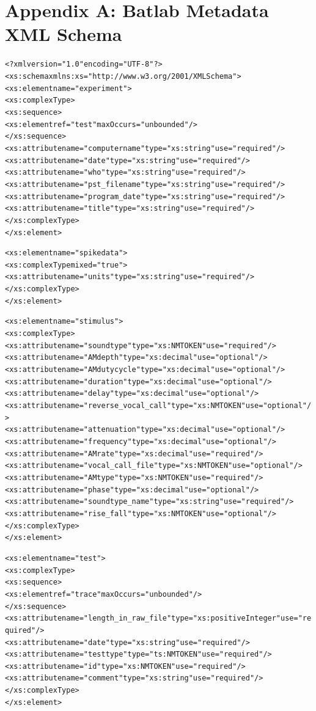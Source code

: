 \documentclass[11pt,letterpaper]{article}
\begin{document}
\section{Appendix A: Batlab Metadata XML Schema}
\begin{footnotesize}
\begin{alltt}
<?xml version="1.0" encoding="UTF-8" ?>\\
<xs:schema xmlns:xs="http://www.w3.org/2001/XMLSchema">
  <xs:element name="experiment">
    <xs:complexType>
      <xs:sequence>
        <xs:element ref="test" maxOccurs="unbounded" />
      </xs:sequence>
      <xs:attribute name="computername" type="xs:string" use="required" />
      <xs:attribute name="date" type="xs:string" use="required" />
      <xs:attribute name="who" type="xs:string" use="required" />
      <xs:attribute name="pst_filename" type="xs:string" use="required" />
      <xs:attribute name="program_date" type="xs:string" use="required" />
      <xs:attribute name="title" type="xs:string" use="required" />
    </xs:complexType>
  </xs:element>

  <xs:element name="spikedata">
    <xs:complexType mixed="true">
      <xs:attribute name="units" type="xs:string" use="required" />
    </xs:complexType>
  </xs:element>

  <xs:element name="stimulus">
    <xs:complexType>
      <xs:attribute name="soundtype" type="xs:NMTOKEN" use="required" />
      <xs:attribute name="AMdepth" type="xs:decimal" use="optional" />
      <xs:attribute name="AMdutycycle" type="xs:decimal" use="optional"/>
      <xs:attribute name="duration" type="xs:decimal" use="optional" />
      <xs:attribute name="delay" type="xs:decimal" use="optional" />
      <xs:attribute name="reverse_vocal_call" type="xs:NMTOKEN" use="optional" />
      <xs:attribute name="attenuation" type="xs:decimal" use="optional" />
      <xs:attribute name="frequency" type="xs:decimal" use="optional" />
      <xs:attribute name="AMrate" type="xs:decimal" use="required" />
      <xs:attribute name="vocal_call_file" type="xs:NMTOKEN" use="optional" />
      <xs:attribute name="AMtype" type="xs:NMTOKEN" use="required" />
      <xs:attribute name="phase" type="xs:decimal" use="optional" />
      <xs:attribute name="soundtype_name" type="xs:string" use="required" />
      <xs:attribute name="rise_fall" type="xs:NMTOKEN" use="optional" />
    </xs:complexType>
  </xs:element>

  <xs:element name="test">
    <xs:complexType>
      <xs:sequence>
        <xs:element ref="trace" maxOccurs="unbounded" />
      </xs:sequence>
      <xs:attribute name="length_in_raw_file" type="xs:positiveInteger" use="required" />
      <xs:attribute name="date" type="xs:string" use="required" />
      <xs:attribute name="testtype" type="ts:NMTOKEN" use="required" />
      <xs:attribute name="id" type="xs:NMTOKEN" use="required" />
      <xs:attribute name="comment" type="xs:string" use="required" />
    </xs:complexType>
  </xs:element>


\end{alltt}
\end{footnotesize}
\end{document}
